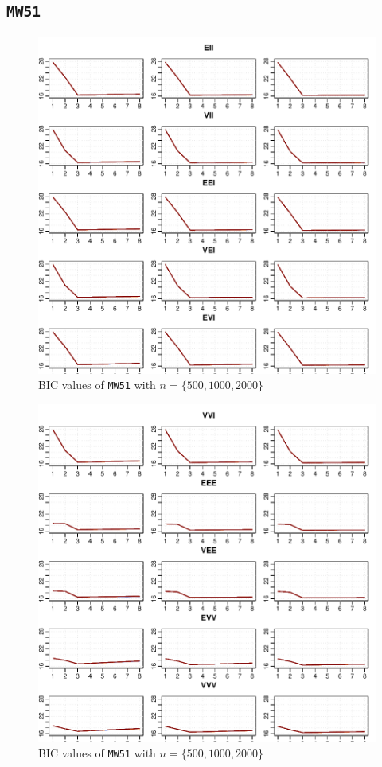 \clearpage

\subsection{{\tt MW51}}

\begin{figure}[h!]
    \centering
\includegraphics{App_plots-figmw51bicfirst}
    \caption{BIC values of {\tt MW51} with $n=\{500, 1000, 2000\}$}
    \label{fig:bicmw34first}
\end{figure}

\begin{figure}[h!]
    \centering
\includegraphics{App_plots-figmw51bicsecond}
    \caption{BIC values of {\tt MW51} with $n=\{500, 1000, 2000\}$}
    \label{fig:bicmw34second}
\end{figure}

